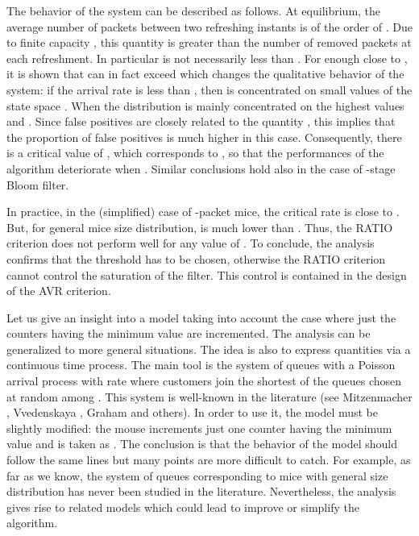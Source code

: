 \documentclass{amsart}
\begin{document}
The behavior of the system can be described as follows. At equilibrium, the average number
of  packets between  two refreshing  instants is  of the  order  of .  Due to  finite capacity  , this  quantity is  greater than  the number  of removed
packets     at  each  refreshment.   In  particular     is  not
necessarily   less  than   .  For     enough   close  to   ,  it   is   shown  that
 can in  fact exceed  which changes  the qualitative behavior of
the  system:  if  the  arrival   rate    is  less  than  ,  then
  is concentrated  on  small  values   of  the state  space
.  When   the  distribution   is
mainly concentrated on the highest values  and . Since false positives are closely
related  to the  quantity ,  this implies  that the  proportion  of false
positives is much higher in this case.  Consequently, there is a critical value  of
,  which corresponds  to  ,  so that  the  performances of the
algorithm  deteriorate when . Similar conclusions hold also in the case of
-stage Bloom filter. 


In practice, in the (simplified) case of -packet mice, the critical rate  is close
to . But, for general mice size distribution,  is much lower than . Thus, the
RATIO criterion does not perform well for any value of . To conclude, the analysis
confirms that the threshold  has to be chosen, otherwise the RATIO criterion cannot
control the saturation of the filter. This control is contained in the  design of the AVR
criterion. 

Let us give an insight into  a model taking into account the case where just the counters
having the minimum value are incremented. The analysis can be generalized to  more
general situations. The idea is also to express quantities via a continuous time
process. The main tool is the system of  queues with a Poisson arrival process with
rate  where customers join the shortest of the  queues chosen at random
among . This system is well-known in the literature (see Mitzenmacher
\cite{Mitzenmacher-1}, Vvedenskaya \cite{Vvedenskaya-1}, Graham \cite{Graham-3} and
others). In order to use it, the model must be  slightly modified: the mouse increments
just one counter having the minimum value and  is taken as . The conclusion is
that the  behavior of the model should follow the same lines but many points are more
difficult  to catch. For example, as far as we know, the system of queues corresponding to
mice with general size distribution has never been studied in the
literature. Nevertheless,  the analysis gives rise to related models which could lead to
improve or simplify the algorithm. 
\end{document}
